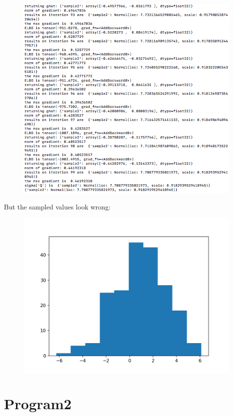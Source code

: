 \documentclass[12pt]{article}%
\theoremstyle{definition}
\begin{document}
	\begin{figure}[h]
	\includegraphics[scale=0.6]{p1_variational}
	\end{figure}
	
	\newpage 
	But the sampled values look wrong:
	
	\begin{figure}[h]
	\includegraphics[scale=0.7]{p1histogram.png}
	\end{figure}
	
	\newpage
	
	\section{Program2}
	\begin{figure}[h]
	\end{figure}
	
\end{document}
